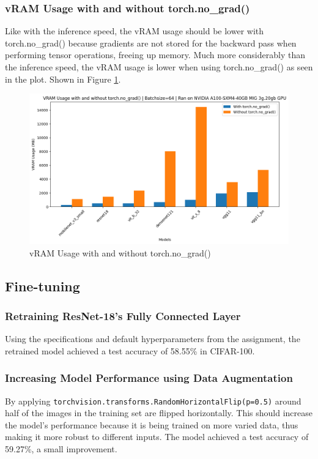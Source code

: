 \documentclass[a4paper]{article}
\begin{document}
\subsubsection{vRAM Usage with and without torch.no\_grad()}
Like with the inference speed, the vRAM usage should be lower with torch.no\_grad() because gradients are not
stored for the backward pass when performing tensor operations, freeing up memory. Much more considerably than the
inference speed, the vRAM usage is lower when using torch.no\_grad() as seen in the plot. Shown in Figure
\ref{fig:VRAM-vs-noGrad}.
\begin{figure}[h]
    \centering
    \includegraphics[width=0.75\linewidth]{"imgs/VRAM-vs-noGrad.png"}
    \caption{vRAM Usage with and without torch.no\_grad()}
    \label{fig:VRAM-vs-noGrad}
\end{figure}
\bigskip

\subsection{Fine-tuning}
\subsubsection{Retraining ResNet-18's Fully Connected Layer}
Using the specifications and default hyperparameters from the assignment, the retrained model achieved a test
accuracy of 58.55\% in CIFAR-100.

\subsubsection{Increasing Model Performance using Data Augmentation}
By applying \texttt{torchvision.transforms.RandomHorizontalFlip(p=0.5)} around half of the images in the training
set are flipped horizontally. This should increase the model's performance because it is being trained on more
varied data, thus making it more robust to different inputs. The model achieved a test accuracy of 59.27\%, a small
improvement.
\end{document}
